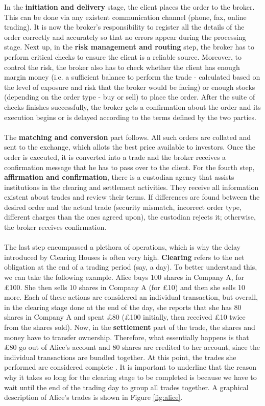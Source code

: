 \documentclass[12pt,twoside]{article}
\begin{document}
In the \textbf{initiation and delivery} stage, the client places the order to the broker. This can be done via any existent communication channel (phone, fax, online trading). It is now the broker's responsibility to register all the details of the order correctly and accurately so that no errors appear during the processing stage. Next up, in the \textbf{risk management and routing} step, the broker has to perform critical checks to ensure the client is a reliable source. Moreover, to control the risk, the broker also has to check whether the client has enough margin money (i.e. a sufficient balance to perform the trade - calculated based on the level of exposure and risk that the broker would be facing) or enough stocks (depending on the order type - buy or sell) to place the order. After the suite of checks finishes successfully, the broker gets a confirmation about the order and its execution begins or is delayed according to the terms defined by the two parties. 
\\ \\
The \textbf{matching and conversion} part follows. All such orders are collated and sent to the exchange, which allots the best price available to investors. Once the order is executed, it is converted into a trade and the broker receives a confirmation message that he has to pass over to the client. For the fourth step, \textbf{affirmation and confirmation}, there is a custodian agency that assists institutions in the clearing and settlement activities. They receive all information existent about trades and review their terms. If differences are found between the desired order and the actual trade (security mismatch, incorrect order type, different charges than the ones agreed upon), the custodian rejects it; otherwise, the broker receives confirmation. 
\\ \\
The last step encompassed a plethora of operations, which is why the delay introduced by Clearing Houses is often very high. \textbf{Clearing} refers to the net obligation at the end of a trading period (say, a day). To better understand this, we can take the following example. Alice buys 100 shares in Company A, for \pounds 100. She then sells 10 shares in Company A (for \pounds 10) and then she sells 10 more. Each of these actions are considered an individual transaction, but overall, in the clearing stage done at the end of the day, she reports that she has 80 shares in Company A and spent \pounds 80 (\pounds 100 initially, then received \pounds 10 twice from the shares sold). Now, in the \textbf{settlement} part of the trade, the shares and money have to transfer ownership. Therefore, what essentially happens is that \pounds 80 go out of Alice's account and 80 shares are credited to her account, since the individual transactions are bundled together. At this point, the trades she performed are considered complete \cite{TradeCycle2}. It is important to underline that the reason why it takes so long for the clearing stage to be completed is because we have to wait until the end of the trading day to group all trades together. A graphical description of Alice's trades is shown in Figure \ref{fig:alice}.
\end{document}
